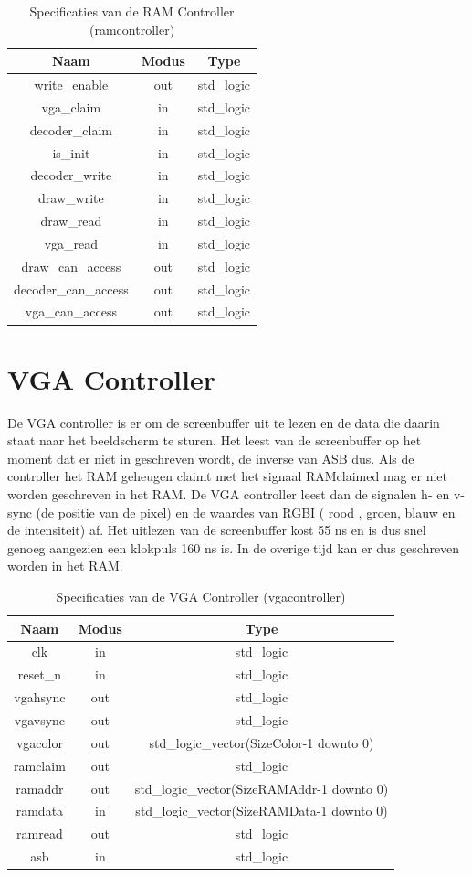 \documentclass{scrreprt} %
\begin{document}
\begin{table}[H]
\centering
\caption{Specificaties van de RAM Controller (ramcontroller)}
\label{tab:spec-ramcontroller}
\begin{tabular}{c c c}
	\hline\hline
 	Naam & Modus & Type\\
 	\hline	
	write\_enable & out & std\_logic\\
	vga\_claim & in & std\_logic\\
	decoder\_claim & in & std\_logic\\
	is\_init & in & std\_logic\\
	decoder\_write & in & std\_logic\\
	draw\_write & in & std\_logic\\
	draw\_read & in & std\_logic\\
	vga\_read & in & std\_logic\\
	draw\_can\_access & out & std\_logic\\
	decoder\_can\_access & out & std\_logic\\
	vga\_can\_access & out & std\_logic\\
  	\hline
\end{tabular}
\end{table}

\section{VGA Controller}
De VGA controller is er om de screenbuffer uit te lezen en de data die daarin staat naar het beeldscherm te sturen. Het leest van de screenbuffer op het moment dat er niet in geschreven wordt, de inverse van ASB dus. Als de controller het RAM geheugen claimt met het signaal RAMclaimed mag er niet worden geschreven in het RAM. De VGA controller leest dan de signalen h- en v-sync (de positie van de pixel) en de waardes van RGBI ( rood , groen, blauw en de intensiteit) af. Het uitlezen van de screenbuffer kost 55 ns en is dus snel genoeg aangezien een klokpuls 160 ns is. In de overige tijd kan er dus geschreven worden in het RAM.

\begin{table}[H]
\centering
\caption{Specificaties van de VGA Controller (vgacontroller)}
\label{tab:spec-vgacontroller}
\begin{tabular}{c c c}
	\hline\hline
 	Naam & Modus & Type\\
 	\hline	
	clk & in & std\_logic \\ 
	reset\_n & in & std\_logic \\ 
	vgahsync & out & std\_logic \\ 
	vgavsync & out & std\_logic \\ 
	vgacolor & out & std\_logic\_vector(SizeColor-1 downto 0) \\
	ramclaim & out & std\_logic \\ 
	ramaddr & out & std\_logic\_vector(SizeRAMAddr-1 downto 0) \\
	ramdata & in & std\_logic\_vector(SizeRAMData-1 downto 0) \\ 
	ramread & out & std\_logic \\
	asb & in & std\_logic \\
  	\hline
\end{tabular}
\end{table}
\end{document}
